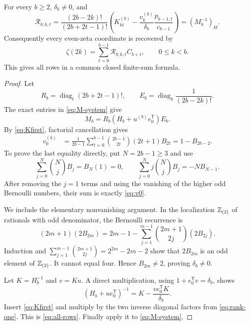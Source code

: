\begin{theorem}
\label{thm:all-rows}
For every $b\geq2$, $\delta_b\ne0$, and
\begin{equation}\label{eq:all-rows}
 \boxed{\displaystyle
 \mathcal R_{b;k,t}=
 \frac{(2b-2k)!}{(2b+2t-1)!}
 \left(
 K_{kt}^{(b)}-
 \frac{v_k^{(b)}}{\delta_b}\frac{p_{b-1,t}}{c_{b-1}}
 \right)
 =(M_b^{-1})_{kt}.}
\end{equation}
Consequently every even-zeta coordinate is recovered by
\begin{equation}\label{eq:all-coordinates}
 \boxed{\displaystyle
 \zeta(2k)=\sum_{t=0}^{b-1}\mathcal R_{b;k,t}C_{b+t},
 \qquad 0\leq k<b.}
\end{equation}
This gives all rows in a common closed finite-sum formula.
\end{theorem}
\begin{proof}
Let
\[
 R_b=\operatorname{diag}_{t}(2b+2t-1)!,\qquad
 E_b=\operatorname{diag}_{k}\frac1{(2b-2k)!}.
\]
The exact entries in \eqref{eq:M-system} give
\begin{equation}\label{eq:rank-one}
 M_b=R_b(H_b+u^{(b)}e_0^{\mathsf T})E_b.
\end{equation}
By \eqref{eq:Kfirst}, factorial cancellation gives
\begin{align}\label{eq:v0}
 v_0^{(b)}
 &=\frac1{2b-1}\sum_{t=0}^{b-1}
   \binom{2b-1}{2t}(2t+1)B_{2t}
 =1-B_{2b-2}.
\end{align}
To prove the last equality directly, put $N=2b-1\geq3$ and use
\[
 \sum_{j=0}^N\binom NjB_j=B_N(1)=0,\qquad
 \sum_{j=0}^N j\binom NjB_j=-NB_{N-1}.
\]
After removing the $j=1$ terms and using the vanishing of the higher
odd Bernoulli numbers, their sum is exactly \eqref{eq:v0}.

We include the elementary nonvanishing argument. In the localization
$\mathbb Z_{(2)}$ of rationals with odd denominator, the Bernoulli recurrence
is
\[
 (2m+1)(2B_{2m})=2m-1-
  \sum_{j=1}^{m-1}\binom{2m+1}{2j}(2B_{2j}).
\]
Induction and
$\sum_{j=1}^{m-1}\binom{2m+1}{2j}=2^{2m}-2m-2$
show that $2B_{2m}$ is an odd element of $\mathbb Z_{(2)}$.
It cannot equal four. Hence $B_{2m}\ne2$, proving $\delta_b\ne0$.

Let $K=H_b^{-1}$ and $v=Ku$. A direct multiplication, using
$1+e_0^{\mathsf T}v=\delta_b$, shows
\[
 (H_b+ue_0^{\mathsf T})^{-1}
 =K-\frac{ve_0^{\mathsf T}K}{\delta_b}.
\]
Insert \eqref{eq:Kfirst} and multiply by the two inverse diagonal
factors from \eqref{eq:rank-one}. This is \eqref{eq:all-rows}.
Finally apply it to \eqref{eq:M-system}.
\end{proof}

